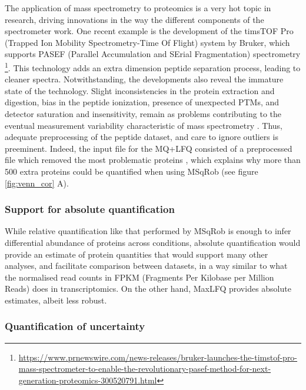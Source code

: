 The application of mass spectrometry to proteomics is a very hot topic in research, driving innovations in the way the different components of the spectrometer work. One recent example is the development of the timsTOF\texttrademark\xspace Pro (Trapped Ion Mobility Spectrometry-Time Of Flight) system by Bruker, which supports PASEF (Parallel Accumulation and SErial Fragmentation) spectrometry \footnote{\href{https://www.prnewswire.com/news-releases/bruker-launches-the-timstof-pro-mass-spectrometer-to-enable-the-revolutionary-pasef-method-for-next-generation-proteomics-300520791.html}{https://www.prnewswire.com/news-releases/bruker-launches-the-timstof-pro-mass-spectrometer-to-enable-the-revolutionary-pasef-method-for-next-generation-proteomics-300520791.html}}. This technology adds  an extra dimension peptide separation process, leading to cleaner spectra.
Notwithstanding, the developments also reveal the immature state of the technology. Slight inconsistencies in the protein extraction and digestion, bias in the peptide ionization, presence of unexpected PTMs, and detector saturation and insensitivity, remain as problems contributing to the eventual measurement variability characteristic of mass spectrometry \cite{Piehowski2013}. Thus, adequate preprocessing of the peptide dataset, and care to ignore outliers is preeminent. Indeed, the input file for the MQ+LFQ consisted of a preprocessed file which removed the most problematic proteins \cite{Cox2014}, which explains why more than 500 extra proteins could be quantified when using MSqRob (see figure \ref{fig:venn_cor} A).

\subsubsection{Support for absolute quantification}

While relative quantification like that performed by MSqRob is enough to infer differential abundance of proteins across conditions, absolute quantification would provide an estimate of protein quantities that would support many other analyses, and facilitate comparison between datasets, in a way similar to what the normalised read counts in FPKM (Fragments Per Kilobase per Million Reads) does in transcriptomics. On the other hand, MaxLFQ provides absolute estimates, albeit less robust.

\subsubsection{Quantification of uncertainty}

